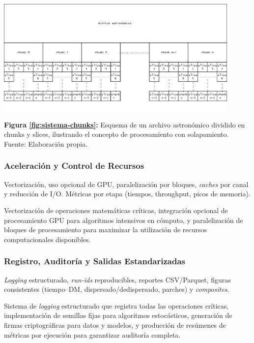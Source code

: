 \begin{center}
\includegraphics[width=0.9\textwidth]{figures/sistema-chunks.png}

\noindent\textbf{Figura \ref{fig:sistema-chunks}:} Esquema de un archivo astronómico dividido en chunks y slices, ilustrando el concepto de procesamiento con solapamiento. Fuente: Elaboración propia.
\label{fig:sistema-chunks}
\vspace{0.5cm}
\end{center}

\subsubsection{Aceleración y Control de Recursos}

Vectorización, uso opcional de GPU, paralelización por bloques, \textit{caches} por canal y reducción de I/O. Métricas por etapa (tiempos, throughput, picos de memoria).

Vectorización de operaciones matemáticas críticas, integración opcional de procesamiento GPU para algoritmos intensivos en cómputo, y paralelización de bloques de procesamiento para maximizar la utilización de recursos computacionales disponibles.

\subsubsection{Registro, Auditoría y Salidas Estandarizadas}

\textit{Logging} estructurado, \textit{run-ids} reproducibles, reportes CSV/Parquet, figuras consistentes (tiempo--DM, dispersado/dedispersado, parches) y \textit{composites}.

Sistema de \emph{logging} estructurado que registra todas las operaciones críticas, implementación de semillas fijas para algoritmos estocásticos, generación de firmas criptográficas para datos y modelos, y producción de resúmenes de métricas por ejecución para garantizar auditoría completa.

